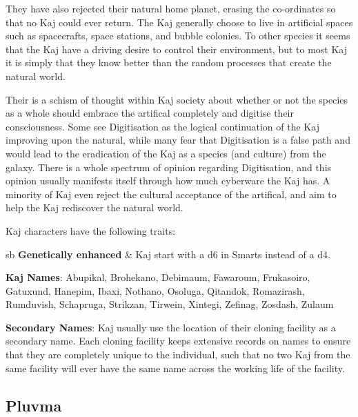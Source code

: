 \documentclass[10pt,twoside]{article}
\newenvironment{standardtable}{
    \par\vspace*{8pt}
    \noindent
    \fontfamily{lmss}\selectfont %
    \rowcolors{1}{bgtan}{commentgreen} %
    \tabularx
}
{\vspace{8pt plus 1pt}\noindent\endtabularx}
\begin{document}
\begin{multicols}{2}
  They have also rejected their natural home planet, erasing the co-ordinates so that no Kaj could ever return. The Kaj generally choose to live in artificial spaces such as spacecrafts, space stations, and bubble colonies. To other species it seems that the Kaj have a driving desire to control their environment, but to most Kaj it is simply that they know better than the random processes that create the natural world.

  Their is a schism of thought within Kaj society about whether or not the species as a whole should embrace the artifical completely and digitise their consciousness. Some see Digitisation as the logical continuation of the Kaj improving upon the natural, while many fear that Digitisation is a false path and would lead to the eradication of the Kaj as a species (and culture) from the galaxy. There is a whole spectrum of opinion regarding Digitisation, and this opinion usually manifests itself through how much cyberware the Kaj has. A minority of Kaj even reject the cultural acceptance of the artifical, and aim to help the Kaj rediscover the natural world.

  Kaj characters have the following traits:
  \begin{standardtable}{\linewidth}{sb}
    \textbf{Genetically enhanced} & Kaj start with a d6 in Smarts instead of a d4.\\
  \end{standardtable}

  \textbf{Kaj Names}: Abupikal, Brohekano, Debimaum, Fawaroum, Frukasoiro, Gatuxund, Hanepim, Ibaxi, Nothano, Osoluga, Qitandok, Romazirash, Rumduvish, Schapruga, Strikzan, Tirwein, Xintegi, Zefinag, Zosdash, Zulaum

  \textbf{Secondary Names}: Kaj usually use the location of their cloning facility as a secondary name. Each cloning facility keeps extensive records on names to ensure that they are completely unique to the individual, such that no two Kaj from the same facility will ever have the same name across the working life of the facility.

  \columnbreak

  \subsection{Pluvma}


\end{multicols}
\end{document}
